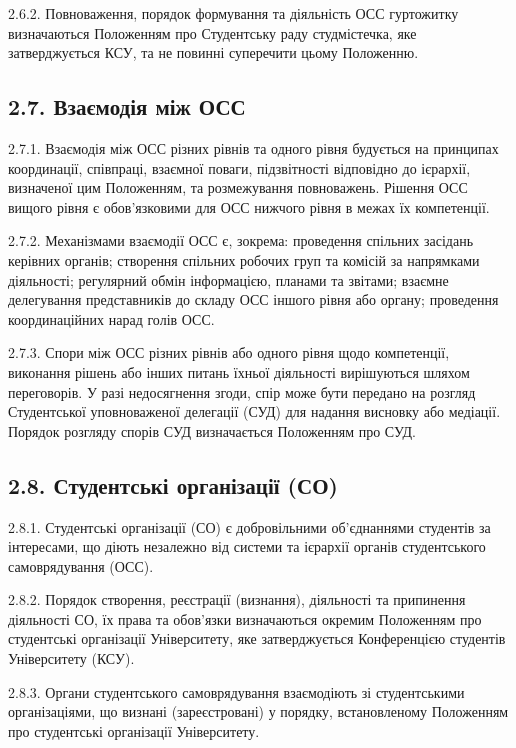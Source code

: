     2.6.2. Повноваження, порядок формування та діяльність ОСС гуртожитку визначаються Положенням про Студентську раду студмістечка, яке затверджується КСУ, та не повинні суперечити цьому Положенню.

\subsection*{2.7. Взаємодія між ОСС}
    2.7.1. Взаємодія між ОСС різних рівнів та одного рівня будується на принципах координації, співпраці, взаємної поваги, підзвітності відповідно до ієрархії, визначеної цим Положенням, та розмежування повноважень. Рішення ОСС вищого рівня є обов'язковими для ОСС нижчого рівня в межах їх компетенції.

    2.7.2. Механізмами взаємодії ОСС є, зокрема: проведення спільних засідань керівних органів; створення спільних робочих груп та комісій за напрямками діяльності; регулярний обмін інформацією, планами та звітами; взаємне делегування представників до складу ОСС іншого рівня або органу; проведення координаційних нарад голів ОСС.

    2.7.3. Спори між ОСС різних рівнів або одного рівня щодо компетенції, виконання рішень або інших питань їхньої діяльності вирішуються шляхом переговорів. У разі недосягнення згоди, спір може бути передано на розгляд Студентської уповноваженої делегації (СУД) для надання висновку або медіації. Порядок розгляду спорів СУД визначається Положенням про СУД.

\subsection*{2.8. Студентські організації (СО)}
    2.8.1. Студентські організації (СО) є добровільними об'єднаннями студентів за інтересами, що діють незалежно від системи та ієрархії органів студентського самоврядування (ОСС).

    2.8.2. Порядок створення, реєстрації (визнання), діяльності та припинення діяльності СО, їх права та обов'язки визначаються окремим Положенням про студентські організації Університету, яке затверджується Конференцією студентів Університету (КСУ).

    2.8.3. Органи студентського самоврядування взаємодіють зі студентськими організаціями, що визнані (зареєстровані) у порядку, встановленому Положенням про студентські організації Університету.